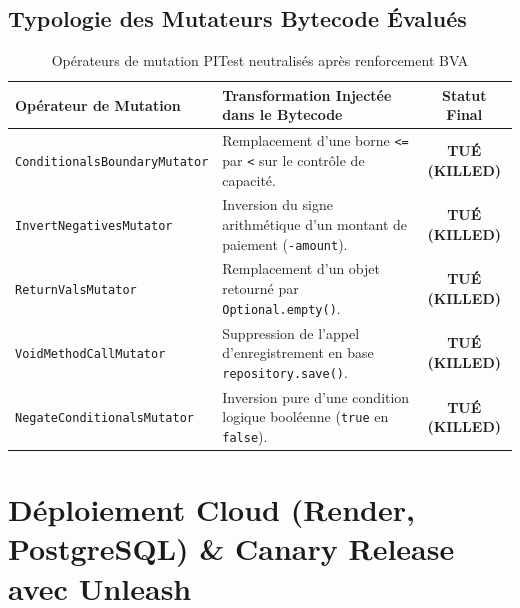 \documentclass[11pt, a4paper, openany]{report}
\begin{document}
\section{Typologie des Mutateurs Bytecode Évalués}

\begin{table}[h]
\centering
\renewcommand{\arraystretch}{1.2}
\small
\begin{tabularx}{\textwidth}{|l|X|c|}
\hline
\rowcolor{primary!20}
\textbf{Opérateur de Mutation} & \textbf{Transformation Injectée dans le Bytecode} & \textbf{Statut Final} \\ \hline
\texttt{ConditionalsBoundaryMutator} & Remplacement d'une borne \texttt{<=} par \texttt{<} sur le contrôle de capacité. & \textbf{\color{success}TUÉ (KILLED)} \\ \hline
\texttt{InvertNegativesMutator} & Inversion du signe arithmétique d'un montant de paiement (\texttt{-amount}). & \textbf{\color{success}TUÉ (KILLED)} \\ \hline
\texttt{ReturnValsMutator} & Remplacement d'un objet retourné par \texttt{Optional.empty()}. & \textbf{\color{success}TUÉ (KILLED)} \\ \hline
\texttt{VoidMethodCallMutator} & Suppression de l'appel d'enregistrement en base \texttt{repository.save()}. & \textbf{\color{success}TUÉ (KILLED)} \\ \hline
\texttt{NegateConditionalsMutator} & Inversion pure d'une condition logique booléenne (\texttt{true} en \texttt{false}). & \textbf{\color{success}TUÉ (KILLED)} \\ \hline
\end{tabularx}
\caption{Opérateurs de mutation PITest neutralisés après renforcement BVA}
\end{table}

\chapter{Déploiement Cloud (Render, PostgreSQL) \& Canary Release avec Unleash}
\end{document}
